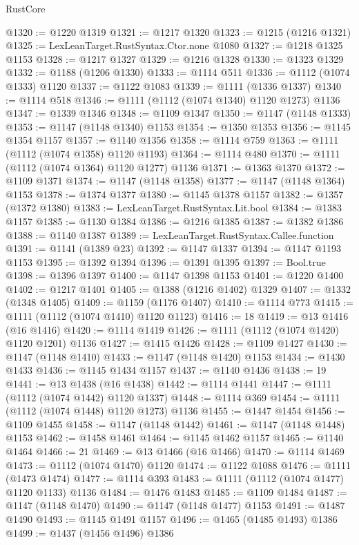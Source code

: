 \begin{lexlean}{RustCore}
\begin{coremodule}
@1320 := @1220 @1319
@1321 := @1217 @1320
@1323 := @1215 (@1216 @1321)
@1325 := LexLeanTarget.RustSyntax.Ctor.none @1080
@1327 := @1218 @1325 @1153
@1328 := @1217 @1327
@1329 := @1216 @1328
@1330 := @1323 @1329
@1332 := @1188 (@1206 @1330)
@1333 := @1114 @511
@1336 := @1112 (@1074 @1333) @1120
@1337 := @1122 @1083
@1339 := @1111 (@1336 @1337)
@1340 := @1114 @518
@1346 := @1111 (@1112 (@1074 @1340) @1120 @1273) @1136
@1347 := @1339 @1346
@1348 := @1109 @1347
@1350 := @1147 (@1148 @1333)
@1353 := @1147 (@1148 @1340) @1153
@1354 := @1350 @1353
@1356 := @1145 @1354 @1157
@1357 := @1140 @1356
@1358 := @1114 @759
@1363 := @1111 (@1112 (@1074 @1358) @1120 @1193)
@1364 := @1114 @480
@1370 := @1111 (@1112 (@1074 @1364) @1120 @1277) @1136
@1371 := @1363 @1370
@1372 := @1109 @1371
@1374 := @1147 (@1148 @1358)
@1377 := @1147 (@1148 @1364) @1153
@1378 := @1374 @1377
@1380 := @1145 @1378 @1157
@1382 := @1357 (@1372 @1380)
@1383 := LexLeanTarget.RustSyntax.Lit.bool
@1384 := @1383 @1157
@1385 := @1130 @1384
@1386 := @1216 @1385
@1387 := @1382 @1386
@1388 := @1140 @1387
@1389 := LexLeanTarget.RustSyntax.Callee.function
@1391 := @1141 (@1389 @23)
@1392 := @1147 @1337
@1394 := @1147 @1193 @1153
@1395 := @1392 @1394
@1396 := @1391 @1395
@1397 := Bool.true
@1398 := @1396 @1397
@1400 := @1147 @1398 @1153
@1401 := @1220 @1400
@1402 := @1217 @1401
@1405 := @1388 (@1216 @1402) @1329
@1407 := @1332 (@1348 @1405)
@1409 := @1159 (@1176 @1407)
@1410 := @1114 @773
@1415 := @1111 (@1112 (@1074 @1410) @1120 @1123)
@1416 := 18
@1419 := @13 @1416 (@16 @1416)
@1420 := @1114 @1419
@1426 := @1111 (@1112 (@1074 @1420) @1120 @1201) @1136
@1427 := @1415 @1426
@1428 := @1109 @1427
@1430 := @1147 (@1148 @1410)
@1433 := @1147 (@1148 @1420) @1153
@1434 := @1430 @1433
@1436 := @1145 @1434 @1157
@1437 := @1140 @1436
@1438 := 19
@1441 := @13 @1438 (@16 @1438)
@1442 := @1114 @1441
@1447 := @1111 (@1112 (@1074 @1442) @1120 @1337)
@1448 := @1114 @369
@1454 := @1111 (@1112 (@1074 @1448) @1120 @1273) @1136
@1455 := @1447 @1454
@1456 := @1109 @1455
@1458 := @1147 (@1148 @1442)
@1461 := @1147 (@1148 @1448) @1153
@1462 := @1458 @1461
@1464 := @1145 @1462 @1157
@1465 := @1140 @1464
@1466 := 21
@1469 := @13 @1466 (@16 @1466)
@1470 := @1114 @1469
@1473 := @1112 (@1074 @1470) @1120
@1474 := @1122 @1088
@1476 := @1111 (@1473 @1474)
@1477 := @1114 @393
@1483 := @1111 (@1112 (@1074 @1477) @1120 @1133) @1136
@1484 := @1476 @1483
@1485 := @1109 @1484
@1487 := @1147 (@1148 @1470)
@1490 := @1147 (@1148 @1477) @1153
@1491 := @1487 @1490
@1493 := @1145 @1491 @1157
@1496 := @1465 (@1485 @1493) @1386
@1499 := @1437 (@1456 @1496) @1386

\end{coremodule}
\end{lexlean}
